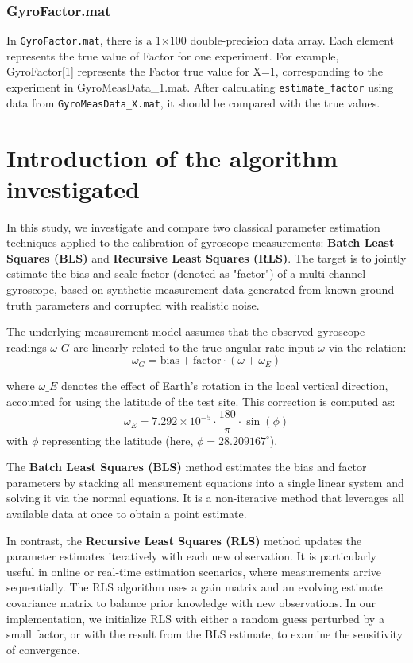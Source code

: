 \documentclass[openany,12pt,UTF8]{article}
\begin{document}
\subsubsection{GyroFactor.mat}
In \texttt{GyroFactor.mat}, there is a 1×100 double-precision data array. Each element represents the true value of Factor for one experiment. For example, GyroFactor[1] represents the Factor true value for X=1, corresponding to the experiment in GyroMeasData\_1.mat. After calculating \texttt{estimate\_factor} using data from \texttt{GyroMeasData\_X.mat}, it should be compared with the true values.

\section{Introduction of the algorithm investigated}
In this study, we investigate and compare two classical parameter estimation techniques applied to the calibration of gyroscope measurements: \textbf{Batch Least Squares (BLS)} and \textbf{Recursive Least Squares (RLS)}. The target is to jointly estimate the bias and scale factor (denoted as "factor") of a multi-channel gyroscope, based on synthetic measurement data generated from known ground truth parameters and corrupted with realistic noise.

The underlying measurement model assumes that the observed gyroscope readings $\omega\_G$ are linearly related to the true angular rate input $\omega$ via the relation:
$$
\omega_G = \text{bias} + \text{factor} \cdot (\omega + \omega_E)
$$

where $\omega\_E$ denotes the effect of Earth's rotation in the local vertical direction, accounted for using the latitude of the test site. This correction is computed as:
$$
\omega_E = 7.292 \times 10^{-5} \cdot \frac{180}{\pi} \cdot \sin(\phi)
$$
with $\phi$ representing the latitude (here, $\phi = 28.209167^\circ$).

The \textbf{Batch Least Squares (BLS)} method estimates the bias and factor parameters by stacking all measurement equations into a single linear system and solving it via the normal equations. It is a non-iterative method that leverages all available data at once to obtain a point estimate.

In contrast, the \textbf{Recursive Least Squares (RLS)} method updates the parameter estimates iteratively with each new observation. It is particularly useful in online or real-time estimation scenarios, where measurements arrive sequentially. The RLS algorithm uses a gain matrix and an evolving estimate covariance matrix to balance prior knowledge with new observations. In our implementation, we initialize RLS with either a random guess perturbed by a small factor, or with the result from the BLS estimate, to examine the sensitivity of convergence.
\end{document}
